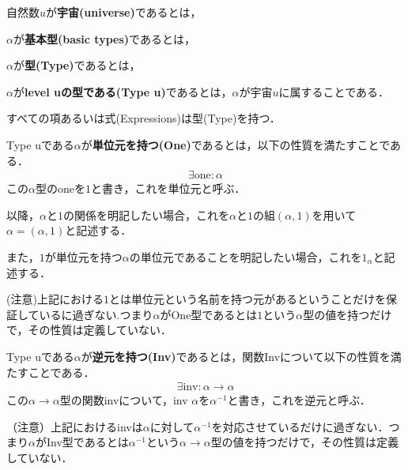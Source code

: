 \begin{definition}
    自然数$u$が\textbf{宇宙(universe)}であるとは，
\end{definition}

\begin{definition}
    $\alpha$が\textbf{基本型(basic types)}であるとは，
\end{definition}

\begin{definition}
    $\alpha$が\textbf{型(Type)}であるとは，
\end{definition}
\fi

\begin{definition}
    $\alpha$が\textbf{level uの型である(Type u)}であるとは，$\alpha$が宇宙$u$に属することである．

    すべての項あるいは式(Expressions)は型(Type)を持つ．

\end{definition}


\begin{definition}
    Type uである$\alpha$が\textbf{単位元を持つ(One)}であるとは，以下の性質を満たすことである．
    \begin{align}
        \exists\text{one} : \alpha
    \end{align}
    この$\alpha$型のoneを$1$と書き，これを単位元と呼ぶ．

    以降，$\alpha$と$1$の関係を明記したい場合，これを$\alpha$と$1$の組$(\alpha,1)$を用いて$\alpha = (\alpha,1)$と記述する．

    また，$1$が単位元を持つ$\alpha$の単位元であることを明記したい場合，これを$1_\alpha$と記述する．

    (注意)上記における$1$とは単位元という名前を持つ元があるということだけを保証しているに過ぎない.つまり$\alpha$がOne型であるとは$1$という$\alpha$型の値を持つだけで，その性質は定義していない．
\end{definition}

\begin{definition}
    Type uである$\alpha$が\textbf{逆元を持つ(Inv)}であるとは，関数Invについて以下の性質を満たすことである．
    \begin{align}
        \exists\text{inv} : \alpha \rightarrow \alpha
    \end{align}
    この$\alpha \rightarrow \alpha$型の関数invについて，inv $\alpha$を$\alpha^{-1}$と書き，これを逆元と呼ぶ．

    （注意）上記におけるinvは$\alpha$に対して$\alpha^{-1}$を対応させているだけに過ぎない．つまり$\alpha$がInv型であるとは$\alpha^{-1}$という$\alpha\rightarrow\alpha$型の値を持つだけで，その性質は定義していない．
\end{definition}

